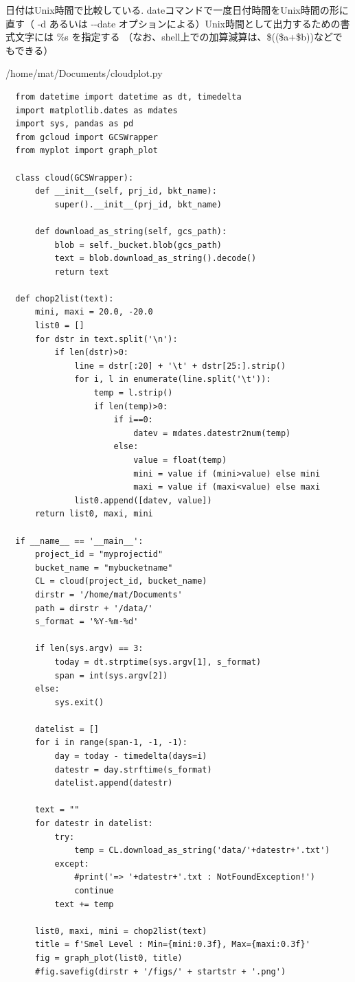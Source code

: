 \documentclass[12pt,a4j]{jsbook}
\begin{document}
日付はUnix時間で比較している.
dateコマンドで一度日付時間をUnix時間の形に直す（ -d あるいは -\;-date オプションによる）Unix時間として出力するための書式文字には \%s を指定する
（なお、shell上での加算減算は、\$((\$a+\$b))などでもできる）


\begin{spacing}{0.8}
\begin{breakbox}[l]{/home/mat/Documents/cloudplot.py}
\begin{verbatim}
  from datetime import datetime as dt, timedelta
  import matplotlib.dates as mdates
  import sys, pandas as pd
  from gcloud import GCSWrapper
  from myplot import graph_plot

  class cloud(GCSWrapper):
      def __init__(self, prj_id, bkt_name):
          super().__init__(prj_id, bkt_name)

      def download_as_string(self, gcs_path):
          blob = self._bucket.blob(gcs_path)
          text = blob.download_as_string().decode()
          return text

  def chop2list(text):
      mini, maxi = 20.0, -20.0
      list0 = []
      for dstr in text.split('\n'):
          if len(dstr)>0:
              line = dstr[:20] + '\t' + dstr[25:].strip()
              for i, l in enumerate(line.split('\t')):
                  temp = l.strip()
                  if len(temp)>0:
                      if i==0:
                          datev = mdates.datestr2num(temp)
                      else:
                          value = float(temp)
                          mini = value if (mini>value) else mini
                          maxi = value if (maxi<value) else maxi
              list0.append([datev, value])
      return list0, maxi, mini

  if __name__ == '__main__':
      project_id = "myprojectid"
      bucket_name = "mybucketname"
      CL = cloud(project_id, bucket_name)
      dirstr = '/home/mat/Documents'
      path = dirstr + '/data/'
      s_format = '%Y-%m-%d'

      if len(sys.argv) == 3:
          today = dt.strptime(sys.argv[1], s_format)
          span = int(sys.argv[2])
      else:
          sys.exit()

      datelist = []
      for i in range(span-1, -1, -1):
          day = today - timedelta(days=i)
          datestr = day.strftime(s_format)
          datelist.append(datestr)

      text = ""
      for datestr in datelist:
          try:
              temp = CL.download_as_string('data/'+datestr+'.txt')
          except:
              #print('=> '+datestr+'.txt : NotFoundException!')
              continue
          text += temp

      list0, maxi, mini = chop2list(text)
      title = f'Smel Level : Min={mini:0.3f}, Max={maxi:0.3f}'
      fig = graph_plot(list0, title)
      #fig.savefig(dirstr + '/figs/' + startstr + '.png')
\end{verbatim}
\end{breakbox}
\end{spacing}
\end{document}
